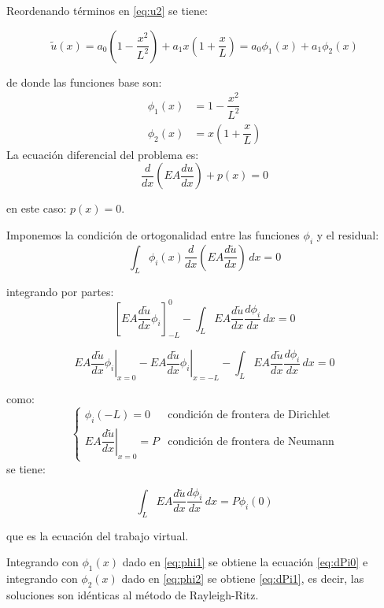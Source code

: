 \begin{example}
\begin{enumerate}[label=\textbf{\arabic*}.]
	Reordenando términos en \eqref{eq:u2} se tiene:
	
	\begin{equation*}
		\tilde{u}(x) = a_{0} \left(1 - \frac{x^{2}}{L^{2}}\right) + a_1 x \left(1 + \frac{x}{L}\right) = a_0 \phi_1(x) + a_1 \phi_2(x)
	\end{equation*}

de donde las funciones base son:
\begin{align}
	\phi_1(x) &= 1 - \dfrac{x^2}{L^2}
	\label{eq:phi1} \\
	\phi_2(x) &= x \left( 1 + \dfrac{x}{L} \right)
	\label{eq:phi2}
\end{align}
	La ecuación diferencial del problema es:
	\begin{equation}
		\dfrac{d}{dx} \left(EA \dfrac{du}{dx}\right) + p(x) = 0
	\end{equation}
	
	en este caso: $p(x) = 0$.
	
	Imponemos la condición de ortogonalidad entre las funciones $\phi_i$ y el residual:
	\begin{equation}
		\int_L \phi_i(x) \dfrac{d}{dx} \left(EA \dfrac{d\tilde{u}}{dx}\right) \, dx = 0
	\end{equation}
	
	integrando por partes:
	$$\left[EA \dfrac{d\tilde{u}}{dx} \phi_i\right]_{-L}^0 - \int_L EA \dfrac{d\tilde{u}}{dx} \dfrac{d \phi_i}{dx} \, dx = 0$$
	
	$$\left.EA \dfrac{d\tilde{u}}{dx} \phi_i\right|_{x=0} - \left.EA \dfrac{d\tilde{u}}{dx} \phi_i\right|_{x=-L} - \int_L EA \dfrac{d\tilde{u}}{dx} \dfrac{d \phi_i}{dx} \, dx = 0$$
	
	como:
	$$
	\begin{cases}
		\phi_i(-L) = 0 & \mbox{condición de frontera de Dirichlet} \\[4mm]
		\left. EA \dfrac{d \tilde{u}}{dx}\right|_{x=0} = P & \mbox{condición de frontera de Neumann}
	\end{cases}
	$$
	se tiene:
	
	\begin{equation}
		\int_L EA \dfrac{d\tilde{u}}{dx} \dfrac{d \phi_i}{dx} \, dx = P \phi_i(0)
		\label{eq:integral}
	\end{equation}
	
	que es la ecuación del trabajo virtual.
	
	Integrando con $\phi_1(x)$ dado en \eqref{eq:phi1} se obtiene la ecuación \eqref{eq:dPi0} e integrando con $\phi_2(x)$ dado en \eqref{eq:phi2} se obtiene \eqref{eq:dPi1}, es decir, las soluciones son idénticas al método de Rayleigh-Ritz.


\end{enumerate}
\end{example}
